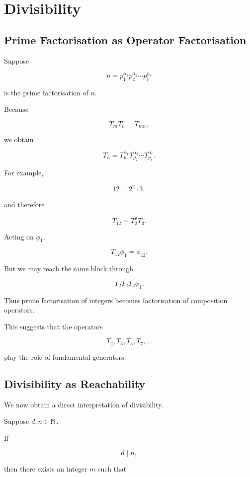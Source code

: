 
\chapter{Divisibility}

\section{Prime Factorisation as Operator Factorisation}

Suppose

\[
n
=
p_1^{\alpha_1}
p_2^{\alpha_2}
\cdots
p_r^{\alpha_r}
\]

is the prime factorisation of \(n\).

Because

\[
T_mT_n=T_{mn},
\]

we obtain

\[
\boxed{
T_n
=
T_{p_1}^{\alpha_1}
T_{p_2}^{\alpha_2}
\cdots
T_{p_r}^{\alpha_r}.
}
\]

For example,

\[
12=2^2\cdot3,
\]

and therefore

\[
\boxed{
T_{12}=T_2^2T_3.
}
\]

Acting on \(\phi_1\),

\[
T_{12}\phi_1=\phi_{12}.
\]

But we may reach the same block through

\[
T_2T_2T_3\phi_1.
\]

Thus prime factorisation of integers becomes factorisation of
composition operators.

This suggests that the operators

\[
T_2,T_3,T_5,T_7,\ldots
\]

play the role of fundamental generators.

\section{Divisibility as Reachability}

We now obtain a direct interpretation of divisibility.

Suppose \(d,n\in\mathbb{N}\).

If

\[
d\mid n,
\]

then there exists an integer \(m\) such that

